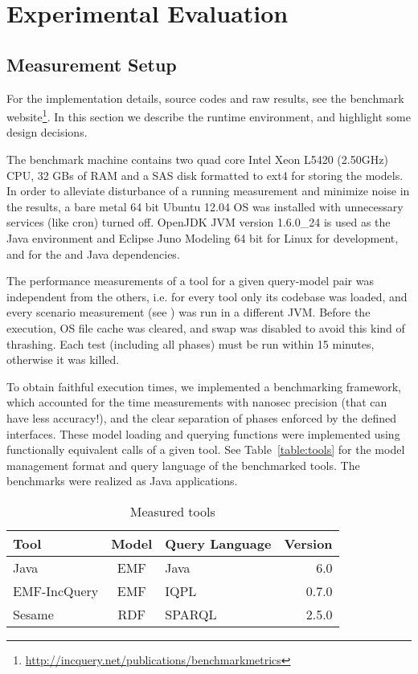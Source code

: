 \section{Experimental Evaluation}
\label{sec:eval}
% 

\subsection{Measurement Setup}

For the implementation details, source codes and raw results, see the
benchmark website\footnote{\url{http://incquery.net/publications/benchmarkmetrics}}. In this
section we describe the runtime environment, and highlight some design
decisions.

The benchmark machine contains two quad core Intel Xeon L5420 (2.50GHz) CPU, 32
GBs of RAM and a SAS disk formatted to ext4 for storing the models. In order to
alleviate disturbance of a running measurement and minimize noise in the results,
a bare metal 64 bit Ubuntu 12.04 OS was installed with unnecessary services
(like cron) turned off. OpenJDK JVM version 1.6.0\_24 is used as the Java
environment and Eclipse Juno Modeling 64 bit for Linux for development, and for
the \incquery{} and Java dependencies.

The performance measurements of a tool for a given query-model pair
was independent from the others, i.e. for every tool only its codebase was
loaded, and every scenario measurement (see ) was run
in a different JVM. Before the execution, OS file cache was cleared, and swap
was disabled to avoid this kind of thrashing. Each test (including all phases)
must be run within 15 minutes, otherwise it was killed.

To obtain faithful execution times, we implemented a benchmarking framework,
which accounted for the time measurements with nanosec precision (that can have
less accuracy!), and the clear separation of phases enforced by the defined
interfaces. These model loading and querying functions were implemented using
functionally equivalent calls of a given tool. See Table~\ref{table:tools} for
the model management format and query language of the benchmarked tools. The
benchmarks were realized as Java applications.

\begin{table}
	\caption{Measured tools}
	\centering
		\begin{tabular}{|l|c|l|r|}
		\hline 
		\textbf{Tool} & \textbf{Model} & \textbf{Query Language} & \textbf{Version}\\ \hline
		Java & EMF & Java & 6.0\\ \hline
		EMF-IncQuery & EMF & IQPL & 0.7.0\\ \hline
		Sesame & RDF & SPARQL & 2.5.0\\ \hline
		 \end{tabular}
	\label{table:tools-met}
\end{table}

